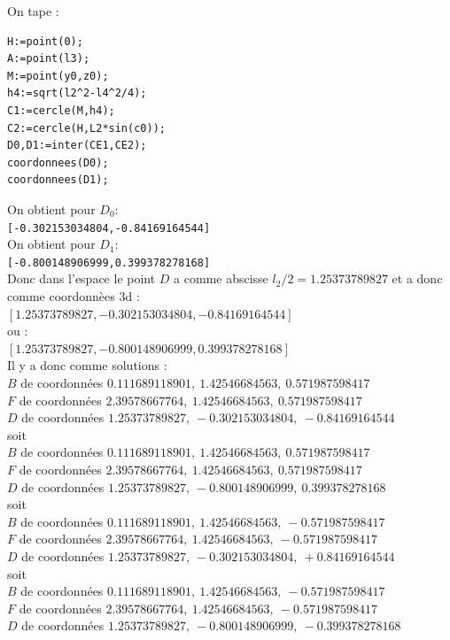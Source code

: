\documentclass[a4paper,11pt]{book}
\begin{document}
On tape :
\begin{verbatim}
H:=point(0);
A:=point(l3);
M:=point(y0,z0);
h4:=sqrt(l2^2-l4^2/4);
C1:=cercle(M,h4);
C2:=cercle(H,L2*sin(c0));
D0,D1:=inter(CE1,CE2);
coordonnees(D0);
coordonnees(D1);
\end{verbatim}
On obtient pour $D_0$:\\
{\tt [-0.302153034804,-0.84169164544]}\\
On obtient pour $D_1$:\\
{\tt [-0.800148906999,0.399378278168]}\\
Donc dans l'espace le point $D$ a comme abscisse $l_2/2=1.25373789827$ et a 
donc comme coordonn\`ees 3d :\\
$[1.25373789827,-0.302153034804,-0.84169164544]$\\
ou :\\
$[1.25373789827,-0.800148906999,0.399378278168]$\\
Il y a donc comme solutions :\\
$B$ de coordonn\'ees $0.111689118901,\ 1.42546684563,\ 0.571987598417$\\
$F$ de coordonn\'ees $2.39578667764,\ 1.42546684563,\ 0.571987598417$\\
$D$ de coordonn\'ees $1.25373789827,\ -0.302153034804,\ -0.84169164544$\\
soit \\
$B$ de coordonn\'ees $0.111689118901,\ 1.42546684563,\ 0.571987598417$\\
$F$ de coordonn\'ees $2.39578667764,\ 1.42546684563,\ 0.571987598417$\\
$D$ de coordonn\'ees $1.25373789827,\ -0.800148906999,\ 0.399378278168$\\
soit\\
$B$ de coordonn\'ees $0.111689118901,\ 1.42546684563,\ -0.571987598417$\\
$F$ de coordonn\'ees $2.39578667764,\ 1.42546684563,\ -0.571987598417$\\
$D$ de coordonn\'ees $1.25373789827,\ -0.302153034804,\ +0.84169164544$\\
soit \\
$B$ de coordonn\'ees $0.111689118901,\ 1.42546684563,\ -0.571987598417$\\
$F$ de coordonn\'ees $2.39578667764,\ 1.42546684563,\ -0.571987598417$\\
$D$ de coordonn\'ees $1.25373789827,\ -0.800148906999,\ -0.399378278168$
\end{document}
